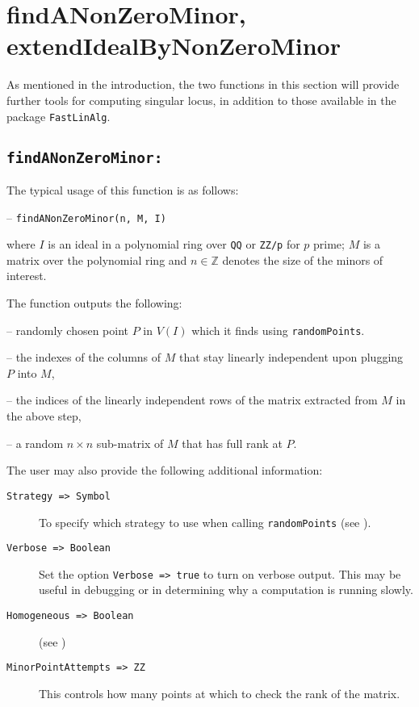 \documentclass[11pt]{amsart}
\theoremstyle{definition}
\begin{document}
\section{findANonZeroMinor, extendIdealByNonZeroMinor}

As mentioned in the introduction, the two functions in this section will provide further tools for computing singular locus, in addition to those available in the package {\tt FastLinAlg}. 

\subsection{\tt findANonZeroMinor:}\label{findANonZeroMinor} The typical usage of this function is as follows: 

\vspace{1em}
-- {\tt findANonZeroMinor(n, M, I)} 

\vspace{1em}
\noindent where $I$ is an ideal
in a polynomial ring over {\tt QQ} or {\tt ZZ/p} for $p$ prime; $M$ is a matrix
over the polynomial ring and $n\in \mathbb{Z}$ denotes the size of the minors of interest.


The function outputs the following:

-- randomly chosen point $P$ in $V(I)$ which it finds using {\tt randomPoints}.

-- the indexes of the columns of $M$ that stay linearly independent upon plugging $P$ into $M$, 

-- the indices of the linearly independent rows of the matrix extracted from $M$ in the above step, 

-- a random $n\times n$ sub-matrix of $M$ that has full rank at $P$.

The user may also provide the following additional information: 

\begin{description}
\item[\tt Strategy => Symbol] To specify which strategy to use when calling {\tt randomPoints} (see ).
  
\item[\tt Verbose => Boolean]
  Set the option {\tt Verbose => true} to turn on verbose output.  This may be useful in debugging or in determining why a computation is running slowly.
  
\item[\tt Homogeneous => Boolean] (see )
  
\item[\tt MinorPointAttempts => ZZ] 
  This controls how many points at which to check the rank of the matrix.
\end{description}
\end{document}
